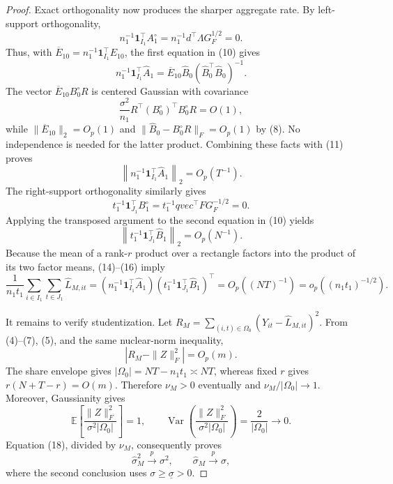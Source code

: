 \documentclass{article}
\begin{document}
\begin{proof}
Exact orthogonality now produces the sharper aggregate rate.  By left-support orthogonality,
\[
 n_1^{-1}\mathbf 1_{I_1}^{\top}A^\circ_1
 =n_1^{-1}d^{\top}\Lambda G_F^{1/2}=0.
\tag{12}
\]
Thus, with \(\overline E_{10}=n_1^{-1}\mathbf 1_{I_1}^{\top}E_{10}\), the first equation in (10) gives
\[
 n_1^{-1}\mathbf 1_{I_1}^{\top}\widehat A_1
 =\overline E_{10}\widehat B_0(\widehat B_0^{\top}\widehat B_0)^{-1}.
\tag{13}
\]
The vector \(\overline E_{10}B^\circ_0R\) is centered Gaussian with covariance
\[
 \frac{\sigma^2}{n_1}R^{\top}(B^\circ_0)^{\top}B^\circ_0R=O(1),
\]
while \(\|\overline E_{10}\|_2=O_p(1)\) and \(\|\widehat B_0-B^\circ_0R\|_F=O_p(1)\) by (8).  No independence is needed for the latter product.  Combining these facts with (11) proves
\[
 \left\|n_1^{-1}\mathbf 1_{I_1}^{\top}\widehat A_1\right\|_2=O_p(T^{-1}).
\tag{14}
\]
The right-support orthogonality similarly gives
\[
 t_1^{-1}\mathbf 1_{J_1}^{\top}B^\circ_1
 =t_1^{-1}qvec^{\top}F G_F^{-1/2}=0.
\tag{15}
\]
Applying the transposed argument to the second equation in (10) yields
\[
 \left\|t_1^{-1}\mathbf 1_{J_1}^{\top}\widehat B_1\right\|_2=O_p(N^{-1}).
\tag{16}
\]
Because the mean of a rank-\(r\) product over a rectangle factors into the product of its two factor means, (14)--(16) imply
\[
 \frac1{n_1t_1}\sum_{i\in I_1}\sum_{t\in J_1}\widehat L_{M,it}
 =\left(n_1^{-1}\mathbf 1_{I_1}^{\top}\widehat A_1\right)
   \left(t_1^{-1}\mathbf 1_{J_1}^{\top}\widehat B_1\right)^{\top}
 =O_p((NT)^{-1})
 =o_p((n_1t_1)^{-1/2}).
\tag{17}
\]

It remains to verify studentization.  Let \(R_M=\sum_{(i,t)\in\Omega_0}(Y_{it}-\widehat L_{M,it})^2\).  From (4)--(7), (5), and the same nuclear-norm inequality,
\[
 |R_M-\|Z\|_F^2|=O_p(m).
\tag{18}
\]
The share envelope gives \(|\Omega_0|=NT-n_1t_1\asymp NT\), whereas fixed \(r\) gives \(r(N+T-r)=O(m)\).  Therefore \(\nu_M>0\) eventually and \(\nu_M/|\Omega_0|\to1\).  Moreover, Gaussianity gives
\[
 \mathbb E\!\left[\frac{\|Z\|_F^2}{\sigma^2|\Omega_0|}\right]=1,
 \qquad
 \operatorname{Var}\!\left(\frac{\|Z\|_F^2}{\sigma^2|\Omega_0|}\right)=\frac2{|\Omega_0|}\to0.
\]
Equation (18), divided by \(\nu_M\), consequently proves
\[
 \widehat\sigma_M^2\xrightarrow{p}\sigma^2,
 \qquad
 \widehat\sigma_M\xrightarrow{p}\sigma,
\tag{19}
\]
where the second conclusion uses \(\sigma\geq\underline\sigma>0\).


\end{proof}
\end{document}
